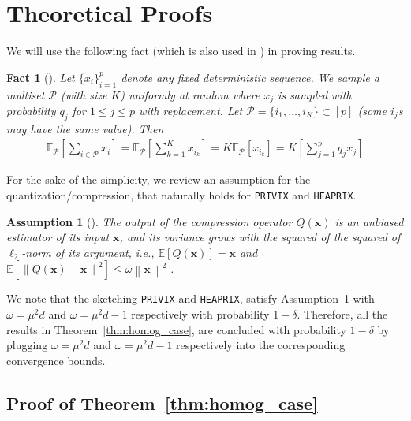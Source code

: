 \documentclass[twoside]{article}
\newtheorem{assumption}{Assumption}
\newtheorem{fact}[theorem]{Fact}
\begin{document}
\section{Theoretical Proofs}





We will use the following fact (which is also used in \cite{li2019convergence,haddadpour2019convergence}) in proving results.
\begin{fact}[\cite{li2019convergence,haddadpour2019convergence}]\label{fact:1}
Let
$\{x_i\}_{i=1}^p$ denote any fixed deterministic sequence. We sample a multiset $\mathcal{P}$ (with size $K$) uniformly at random where $x_j$ is sampled  with probability $q_j$ for $1\leq j\leq p$ with replacement.  Let $\mathcal{P} = \{i_1,\ldots, i_K\} \subset[p]$ (some $i_j$s may have the same value). Then
\begin{align}
    \mathbb{E}_{\mathcal{P}}\left[\sum_{i\in \mathcal{P}}x_i\right]=\mathbb{E}_{\mathcal{P}}\left[\sum_{k=1}^Kx_{i_k}\right]=K\mathbb{E}_{\mathcal{P}}\left[x_{i_k}\right]=K\left[\sum_{j=1}^pq_jx_j\right]
\end{align}
\end{fact}
For the sake of the simplicity, we review an assumption for the quantization/compression, that naturally holds for \texttt{PRIVIX} and \texttt{HEAPRIX}.

\begin{assumption}[\cite{haddadpour2020federated}]\label{Assu:quant}
The output of the compression operator $Q(\mathbf{x})$ is an unbiased estimator of its input $\mathbf{x}$, and its variance grows with the squared of the squared of $\ell_2$-norm of its argument, i.e., $\mathbb{E}\left[Q(\mathbf{x})\right]=\mathbf{x}$ and $\mathbb{E}\left[\left\|Q(\mathbf{x})-\mathbf{x}\right\|^2\right]\leq \omega\left\|\mathbf{x}\right\|^2$ .
\end{assumption}
We note that the sketching \texttt{PRIVIX} and \texttt{HEAPRIX}, satisfy Assumption~\ref{Assu:quant} with $\omega=\mu^2d$ and $\omega=\mu^2d-1$ respectively with probability $1-\delta$. 
Therefore, all the results in Theorem~\ref{thm:homog_case}, are concluded with probability $1-\delta$ by plugging $\omega=\mu^2d$ and $\omega=\mu^2d-1$ respectively into the corresponding convergence bounds.

\subsection{Proof of Theorem~\ref{thm:homog_case}}
\end{document}
